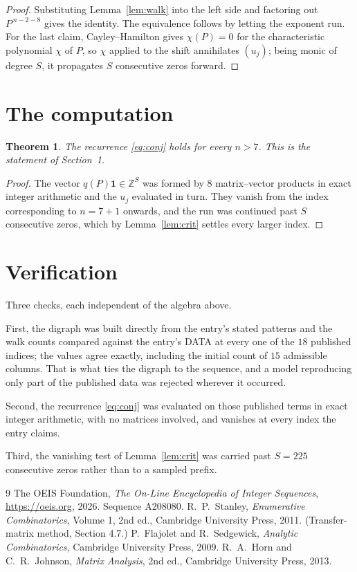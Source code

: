 \documentclass[11pt,a4paper]{article}
\theoremstyle{plain}
\newtheorem{theorem}{Theorem}
\theoremstyle{definition}
\begin{document}
\begin{proof}
Substituting Lemma~\ref{lem:walk} into the left side and factoring out
$P^{\,n-2-8}$ gives the identity. The equivalence follows by letting the exponent
run. For the last claim, Cayley--Hamilton gives $\chi(P)=0$ for the characteristic
polynomial $\chi$ of $P$, so $\chi$ applied to the shift annihilates $(u_j)$; being monic of
degree $S$, it propagates $S$ consecutive zeros forward.
\end{proof}

\section{The computation}

\begin{theorem}
The recurrence \eqref{eq:conj} holds for every $n>7$. This is the statement of
Section~1.
\end{theorem}

\begin{proof}
The vector $q(P)\mathbf{1}\in\mathbb{Z}^{S}$ was formed by $8$ matrix--vector
products in exact integer arithmetic and the $u_j$ evaluated in turn. They vanish from the
index corresponding to $n=7+1$ onwards, and the run was continued past $S$ consecutive
zeros, which by Lemma~\ref{lem:crit} settles every larger index.
\end{proof}

\section{Verification}

Three checks, each independent of the algebra above.

First, the digraph was built directly from the entry's stated patterns and the walk counts
compared against the entry's DATA at every one of the $18$ published indices; the
values agree exactly, including the initial count of $15$ admissible columns. That is
what ties the digraph to the sequence, and a model reproducing only part of the published
data was rejected wherever it occurred.

Second, the recurrence \eqref{eq:conj} was evaluated on those published terms in exact
integer arithmetic, with no matrices involved, and vanishes at every index the entry claims.

Third, the vanishing test of Lemma~\ref{lem:crit} was carried past $S=225$ consecutive
zeros rather than to a sampled prefix.

\begin{thebibliography}{9}
 The OEIS Foundation, \emph{The On-Line Encyclopedia of Integer
Sequences}, \url{https://oeis.org}, 2026. Sequence A208080.
 R.~P.~Stanley, \emph{Enumerative Combinatorics}, Volume 1, 2nd ed.,
Cambridge University Press, 2011. (Transfer-matrix method, Section 4.7.)
 P.~Flajolet and R.~Sedgewick, \emph{Analytic Combinatorics}, Cambridge
University Press, 2009.
 R.~A.~Horn and C.~R.~Johnson, \emph{Matrix Analysis}, 2nd ed., Cambridge
University Press, 2013.
\end{thebibliography}
\end{document}
